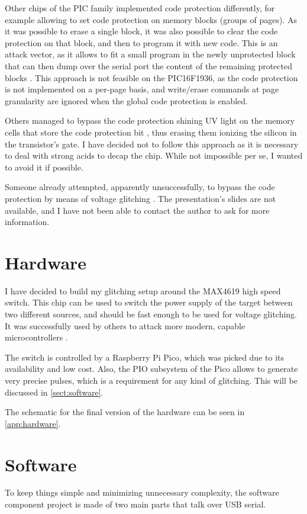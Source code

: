 \documentclass[a4paper,english,twoside,10pt]{article}
\begin{document}
Other chips of the PIC family implemented code protection differently, for example allowing to set code protection on memory blocks (groups of pages). As it was possible to erase a single block, it was also possible to clear the code protection on that block, and then to program it with new code. This is an attack vector, as it allows to fit a small program in the newly unprotected block that can then dump over the serial port the content of the remaining protected blocks \cite{meriac2010heart}. This approach is not feasible on the PIC16F1936, as the code protection is not implemented on a per-page basis, and write/erase commands at page granularity are ignored when the global code protection is enabled.

Others managed to bypass the code protection shining UV light on the memory cells that store the code protection bit \cite{bunniepic}, thus erasing them ionizing the silicon in the transistor's gate. I have decided not to follow this approach as it is necessary to deal with strong acids to decap the chip. While not impossible per se, I wanted to avoid it if possible.

Someone already attempted, apparently unsuccessfully, to bypass the code protection by means of voltage glitching \cite{silviocopyprotection}. The presentation's slides are not available, and I have not been able to contact the author to ask for more information.



\section{Hardware}
I have decided to build my glitching setup around the MAX4619 \cite{maxim:MAX4617-MAX4619} high speed switch. This chip can be used to switch the power supply of the target between two different sources, and should be fast enough to be used for voltage glitching. It was successfully used by others to attack more modern, capable microcontrollers \cite{gerlinskyLPC}.

The switch is controlled by a Raspberry Pi Pico, which was picked due to its availability and low cost. Also, the PIO subsystem of the Pico allows to generate very precise pulses, which is a requirement for any kind of glitching. This will be discussed in \autoref{sect:software}.

The schematic for the final version of the hardware can be seen in \autoref{app:hardware}.



\section{Software}\label{sect:software}
To keep things simple and minimizing unnecessary complexity, the software component project is made of two main parts that talk over USB serial.
\end{document}
